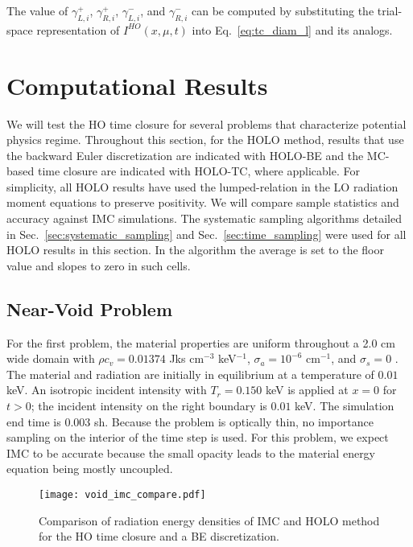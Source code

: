 The value of $\gamma_{L,i}^+$, $\gamma_{R,i}^+$, $\gamma_{L,i}^-$, and $\gamma_{R,i}^-$
can be computed by substituting the trial-space representation of $I^{HO}(x,\mu,t)$ into
Eq.~\eqref{eq:tc_diam_l} and its analogs.


\section{Computational Results}

We will test the HO time closure for several problems that characterize potential physics
regime.  Throughout this
section, for the HOLO method, results that use the backward Euler discretization are indicated with HOLO-BE and the MC-based time
closure are indicated with HOLO-TC, where applicable.  For simplicity, all HOLO results
have used the lumped-relation in the LO radiation moment equations to preserve positivity. We will compare sample statistics
and accuracy against IMC simulations.
The systematic sampling algorithms detailed in Sec.~\ref{sec:systematic_sampling} and
Sec.~\ref{sec:time_sampling} were used for all HOLO results in this
section.  In
the algorithm the average is set to the floor value and slopes to zero in such cells.

\subsection{Near-Void Problem}

For the first problem, the material properties
are uniform throughout a 2.0 cm wide domain with $\rho c_v = 0.01374$ Jks cm$^{-3}$ keV$^{-1}$, $\sigma_a=10^{-6}$ cm$^{-1}$, and $\sigma_s=0$ \invcm.
The material and radiation are initially in equilibrium at a temperature of $0.01$ keV.
An isotropic incident intensity with $T_r = 0.150$ keV is applied
at $x=0$ for $t>0$; the incident intensity on the right boundary is $0.01$ keV.  The simulation end
time is 0.003 sh.  Because the problem is optically thin, no importance sampling on the
interior of the time step is used.   For this problem, we expect IMC to be accurate
because the small opacity leads to the material energy equation being mostly uncoupled.  
\begin{figure}[H]
  \centering
    \texttt{[image: void\_imc\_compare.pdf]}
    \caption{\label{fig:void_imc_compare} Comparison of radiation energy densities of IMC
    and HOLO method for the HO time closure and a BE discretization.}
\end{figure}

